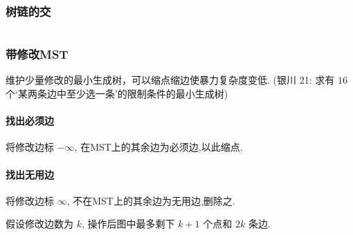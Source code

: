 \subsubsection{树链的交}
	\inputminted{cpp}{src/yzh/path_inter.cpp}

\subsubsection{带修改MST}
	维护少量修改的最小生成树，可以缩点缩边使暴力复杂度变低. (银川 21: 求有 $16$ 个`某两条边中至少选一条'的限制条件的最小生成树) 
	\paragraph{找出必须边}将修改边标 $-\infty$, 在MST上的其余边为必须边,以此缩点.
	\paragraph{找出无用边}将修改边标 $\infty$, 不在MST上的其余边为无用边,删除之. 

	假设修改边数为 $k$, 操作后图中最多剩下 $k+1$ 个点和 $2k$ 条边.
	

